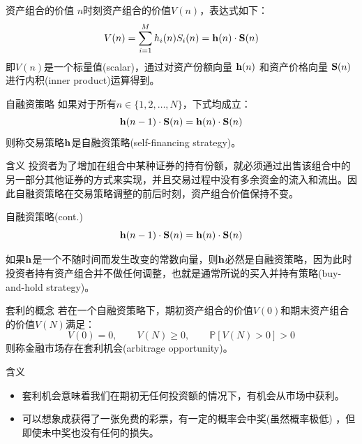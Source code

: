 \documentclass[t]{beamer}
\renewcommand{\Pr}{\mathbb{P}}
\begin{document}
\begin{frame}{资产组合的价值}
$n$时刻资产组合的价值$V(n)$，表达式如下：
\begin{equation*}
V(n)=\sum^{M}_{i=1} h_i(n)S_i(n)={\bf h}(n)\cdot {\bf S}(n)
\end{equation*}
即$V(n)$是一个标量值(scalar)，通过对资产份额向量 ${\bf h}(n)$ 和资产价格向量 ${\bf S}(n)$ 进行内积(inner product)运算得到。
\end{frame}

\begin{frame}{自融资策略}
如果对于所有$n\in\{1,2,\ldots,N\}$，下式均成立：
\begin{equation*}
{\bf h}(n-1)\cdot {\bf S}(n)={\bf h}(n)\cdot {\bf S}(n)
\end{equation*}
则称交易策略${\bf h}$是自融资策略(self-financing strategy)。

\begin{block}{含义}
投资者为了增加在组合中某种证券的持有份额，就必须通过出售该组合中的另一部分其他证券的方式来实现，并且交易过程中没有多余资金的流入和流出。因此自融资策略在{\color{red}交易策略调整的前后时刻}，资产组合价值保持不变。
\end{block}
\end{frame}

\begin{frame}{自融资策略(cont.)}
\begin{equation*}
{\bf h}(n-1)\cdot {\bf S}(n)={\bf h}(n)\cdot {\bf S}(n)
\end{equation*}

如果${\bf h}$是一个不随时间而发生改变的常数向量，则${\bf h}$必然是自融资策略，因为此时投资者持有资产组合并不做任何调整，也就是通常所说的买入并持有策略(buy-and-hold strategy)。
\end{frame}

\begin{frame}{套利的概念}
若在一个自融资策略下，期初资产组合的价值$V(0)$和期末资产组合的价值$V(N)$满足：
\[V(0)=0,\qquad V(N)\ge 0,\qquad \Pr[V(N)>0]>0 \]
则称金融市场存在套利机会(arbitrage opportunity)。

\begin{block}{含义}
	\begin{itemize}
		\item 套利机会意味着我们在期初无任何投资额的情况下，有机会从市场中获利。
		\item 可以想象成获得了一张免费的彩票，有一定的概率会中奖(虽然概率极低)
		，但即使未中奖也没有任何的损失。
	\end{itemize}
 \end{block}
\end{frame}
\end{document}
